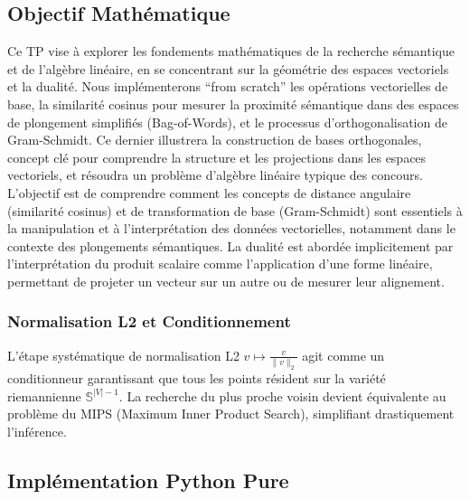 \documentclass[11pt,a4paper]{report}
\begin{document}
\hypertarget{objectif-mathuxe9matique}{%
\subsection{Objectif Mathématique}\label{objectif-mathuxe9matique}}

Ce TP vise à explorer les fondements mathématiques de la recherche
sémantique et de l'algèbre linéaire, en se concentrant sur la géométrie
des espaces vectoriels et la dualité. Nous implémenterons ``from
scratch'' les opérations vectorielles de base, la similarité cosinus
pour mesurer la proximité sémantique dans des espaces de plongement
simplifiés (Bag-of-Words), et le processus d'orthogonalisation de
Gram-Schmidt. Ce dernier illustrera la construction de bases
orthogonales, concept clé pour comprendre la structure et les
projections dans les espaces vectoriels, et résoudra un problème
d'algèbre linéaire typique des concours. L'objectif est de comprendre
comment les concepts de distance angulaire (similarité cosinus) et de
transformation de base (Gram-Schmidt) sont essentiels à la manipulation
et à l'interprétation des données vectorielles, notamment dans le
contexte des plongements sémantiques. La dualité est abordée
implicitement par l'interprétation du produit scalaire comme
l'application d'une forme linéaire, permettant de projeter un vecteur
sur un autre ou de mesurer leur alignement.

\hypertarget{normalisation-l2-et-conditionnement}{%
\subsubsection{Normalisation L2 et
Conditionnement}\label{normalisation-l2-et-conditionnement}}

L'étape systématique de normalisation L2 \(v \mapsto \frac{v}{\|v\|_2}\)
agit comme un conditionneur garantissant que tous les points résident
sur la variété riemannienne \(\mathbb{S}^{|V|-1}\). La recherche du plus
proche voisin devient équivalente au problème du MIPS (Maximum Inner
Product Search), simplifiant drastiquement l'inférence.

\hypertarget{impluxe9mentation-python-pure}{%
\subsection{Implémentation Python
Pure}\label{impluxe9mentation-python-pure}}
\end{document}
